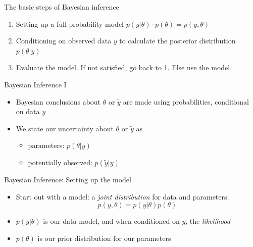 \documentclass[10pt]{beamer}
\begin{document}
\begin{frame}{The basic steps of Bayesian inference}

  \begin{enumerate}
  \item Setting up a full probability model $p(y|\theta) \cdot p(\theta) = p(y,\theta)$ %
  \pause
  \item Conditioning on observed data $y$ to calculate the posterior distribution $p(\theta|y)$%
  \pause
  \item Evaluate the model. If not satisfied, go back to 1. Else use the model.%
   \end{enumerate}
\end{frame}


\begin{frame}{Bayesian Inference I}
  \begin{itemize}
  \item Bayesian conclusions about $\theta$ or $\tilde{y}$ are made using probabilities, {\color{uured} conditional on data} $y$
  \pause
  \item We state our uncertainty about $\theta$ or $\tilde{y}$ as 
  \pause
  \begin{itemize}
    \item parameters: $p(\theta|y)$
    \item potentially observed: $p(\tilde{y}|y)$
  \end{itemize}
  \end{itemize}
\end{frame}


\begin{frame}{Bayesian Inference: Setting up the model}
  \begin{itemize}
  \item Start out with a {\color{uured} model}: a \emph{joint distribution} for data and parameters:
  \[
  p(y,\theta) = p(y|\theta) p(\theta)
  \]
  \pause
  \item $p(y|\theta)$ is our data model, and when conditioned on $y$, the \emph{likelihood}
  \pause
  \item $p(\theta)$ is our prior distribution for our parameters
  \end{itemize}
\end{frame}
\end{document}
